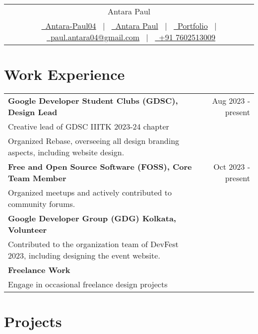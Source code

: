 \documentclass{article}
\begin{document}
\begin{tabularx}{\linewidth}{@{} C @{}}
\Huge{Antara Paul}\\[5pt]
\href{https://github.com/Antara-Paul04}{\raisebox{-0.05\height}{\faGithub}\ Antara-Paul04} \ $|$ \ 
\href{https://www.linkedin.com/in/antara-paul-069a37271/}{\raisebox{-0.05\height}{\faLinkedin}\ Antara Paul} \ $|$ \ 
\href{https://antara-paul04.github.io/portfolio/}{\raisebox{-0.05\height}{\faGlobe}\ Portfolio} \ $|$ \ 
\href{mailto:paul.antara04@gmail.com}{\raisebox{-0.05\height}{\faEnvelope}\ paul.antara04@gmail.com} \ $|$ \ 
\href{tel:+000000000000}{\raisebox{-0.05\height}{\faMobile}\ +91 7602513009}\\
\end{tabularx}


\section{Work Experience}

\begin{tabularx}{\linewidth}{ @{}l r@{} }
\textbf{Google Developer Student Clubs (GDSC), Design Lead} & \hfill Aug 2023 - present \\[3pt]
Creative lead of GDSC IIITK 2023-24 chapter\\
Organized Rebase, overseeing all design branding aspects, including website design. \\[3pt]
\textbf{Free and Open Source Software (FOSS), Core Team Member} & \hfill Oct 2023 - present \\[3pt]
Organized meetups and actively contributed to community forums. \\[3pt]
\textbf{Google Developer Group (GDG) Kolkata, Volunteer} & \\[3pt]
Contributed to the organization team of DevFest 2023, including designing the event website. \\[3pt]
\textbf{Freelance Work} \\[3pt]
Engage in occasional freelance design projects \\
\end{tabularx}

\section{Projects}
\end{document}
